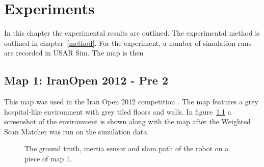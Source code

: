 \chapter{Experiments}
\label{experiments}
In this chapter the experimental results are outlined. The experimental method is outlined in chapter~\ref{method}. For the experiment, a number of simulation runs are recorded in USAR Sim. The map is then 

\section{Map 1: IranOpen 2012 - Pre 2}
This map was used in the Iran Open 2012 competition \cite{iran2012}. The map features a grey hospital-like environment with grey tiled floors and walls. In figure~\ref{fig:map1} a screenshot of the environment is shown along with the map after the Weighted Scan Matcher was run on the simulation data. 

\begin{figure}[ht]
\centering
{}
  \caption{The ground truth, inertia sensor and slam path of the robot on a piece of map 1.}
  \label{fig:map1}
\end{figure}

